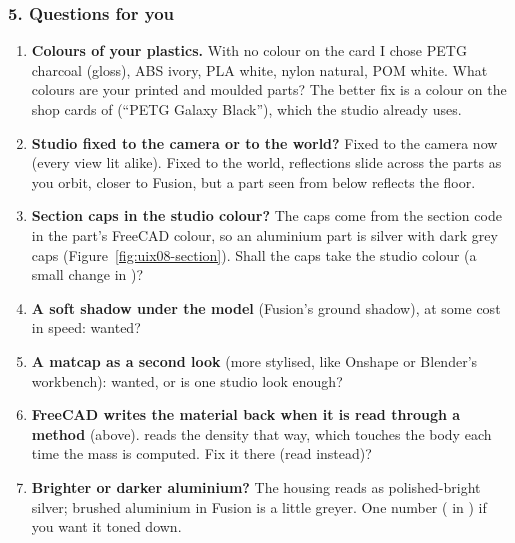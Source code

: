 \subsubsection*{5. Questions for you}
\begin{enumerate}
  \item \textbf{Colours of your plastics.} With no colour on the card I chose PETG charcoal (gloss), ABS ivory,
        PLA white, nylon natural, POM white. What colours are your printed and moulded parts? The better fix is a
        colour on the shop cards of  (``PETG Galaxy Black''), which the studio already uses.
  \item \textbf{Studio fixed to the camera or to the world?} Fixed to the camera now (every view lit alike). Fixed to
        the world, reflections slide across the parts as you orbit, closer to Fusion, but a part seen from below
        reflects the floor.
  \item \textbf{Section caps in the studio colour?} The caps come from the section code in the part's FreeCAD colour,
        so an aluminium part is silver with dark grey caps (Figure~\ref{fig:uix08-section}). Shall the caps take the
        studio colour (a small change in )?
  \item \textbf{A soft shadow under the model} (Fusion's ground shadow), at some cost in speed: wanted?
  \item \textbf{A matcap as a second look} (more stylised, like Onshape or Blender's workbench): wanted, or is one
        studio look enough?
  \item \textbf{FreeCAD writes the material back when it is read through a method} (above).  reads the
        density that way, which touches the body each time the mass is computed. Fix it there (read
         instead)?
  \item \textbf{Brighter or darker aluminium?} The housing reads as polished-bright silver; brushed aluminium in
        Fusion is a little greyer. One number ( in ) if you want it toned down.
\end{enumerate}
